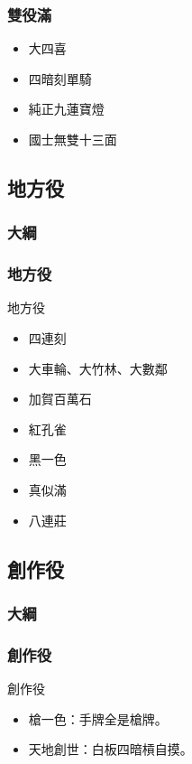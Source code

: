\documentclass[utf8]{beamer}
\begin{document}
\begin{CJK}{UTF8}{bkai}
\begin{frame}
  \frametitle{雙役滿}
  \begin{itemize}
    \item 大四喜
    \item 四暗刻單騎
    \item 純正九蓮寶燈
    \item 國士無雙十三面
  \end{itemize}
\end{frame}

\subsection{地方役}
\begin{frame}
  \frametitle{大綱}
  \begin{multicols}{2}
  \end{multicols}
\end{frame}

\begin{frame}
  \frametitle{地方役}
  \begin{block}{地方役}
    \begin{itemize}
    \item 四連刻
    \item 大車輪、大竹林、大數鄰
    \item 加賀百萬石
    \item 紅孔雀
    \item 黑一色
    \item 真似滿
    \item 八連莊
    \end{itemize}
  \end{block}
\end{frame}

\subsection{創作役}
\begin{frame}
  \frametitle{大綱}
  \begin{multicols}{2}
  \end{multicols}
\end{frame}

\begin{frame}
  \frametitle{創作役}
  \begin{block}{創作役}
    \begin{itemize}
    \item 槍一色：手牌全是槍牌。
    \item 天地創世：白板四暗槓自摸。
      \begin{figure}
      \centering
      \DarkGang{\Bai}\DarkGang{\Bai}\DarkGang{\Bai}\DarkGang{\Bai}\Bai
      \end{figure}
    \end{itemize}
  \end{block}
\end{frame}


\end{CJK}
\end{document}
